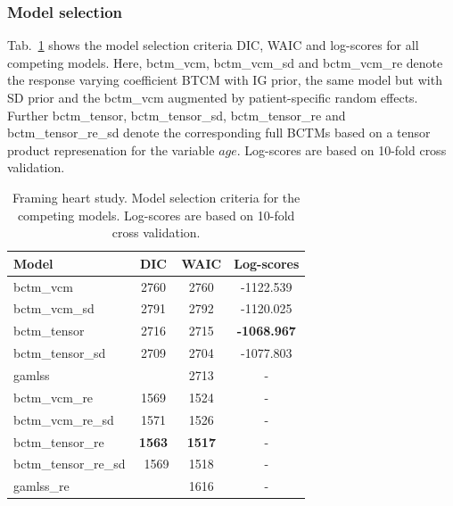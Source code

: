 \documentclass[12pt, a4paper]{article}
\begin{document}
\subsubsection{Model selection}
Tab.~\ref{tab:FHS:modsel} shows the model selection criteria DIC, WAIC and log-scores for all competing models. Here, bctm\_vcm, bctm\_vcm\_sd and bctm\_vcm\_re denote the response varying coefficient BTCM with IG prior, the same model but with SD prior and the bctm\_vcm augmented by patient-specific random effects. Further bctm\_tensor, bctm\_tensor\_sd, bctm\_tensor\_re and bctm\_tensor\_re\_sd denote the corresponding full BCTMs based on a tensor product represenation for the variable $\mathit{age}.$ Log-scores are based on 10-fold cross validation.
\begin{table}[H]
    \centering
    \begin{tabular}{l|ccc}
    \hline\hline
         Model & DIC & WAIC & Log-scores\\
         \hline 
        bctm\_vcm  & 2760 & 2760 & -1122.539 \\
        bctm\_vcm\_sd & 2791 & 2792 & -1120.025 \\
        bctm\_tensor & 2716 & 2715 & \textbf{-1068.967}\\
        bctm\_tensor\_sd & 2709 & 2704 & -1077.803 \\
        gamlss &  & 2713 & - \\
        \hline
        bctm\_vcm\_re & 1569 & 1524 & -  \\
        bctm\_vcm\_re\_sd & 1571 & 1526 & - \\
        bctm\_tensor\_re & \textbf{1563} & \textbf{1517} & -\\
        bctm\_tensor\_re\_sd & \ 1569 & 1518 & -\\
        gamlss\_re & & 1616 & -\\
        \hline\hline
    \end{tabular}
    \caption{Framing heart study. Model selection criteria for the competing models. Log-scores are based on 10-fold cross validation. }
    \label{tab:FHS:modsel}
\end{table}
\end{document}
